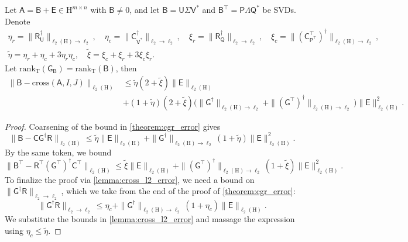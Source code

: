 \documentclass[onefignum,onetabnum]{siamart250211}
\renewenvironment{equation*}{\[}{\]\ignorespacesafterend}
\newcommand{\Hilb}{\mathrm{H}}
\newcommand{\Batrix}[1]{\bm{\Matrix{#1}}}
\newcommand{\Matrix}[1]{\mathsf{#1}}
\newcommand{\trans}{\intercal}
\newcommand{\pinv}{\dagger}
\newcommand{\Rank}[3][]{\mathrm{rank_{#2}} #1( #3 #1)}
\newcommand{\Index}[1]{{#1}}
\newcommand{\cross}[3][]{\mathrm{cross}#1(#2, #3 #1)}
\newcommand{\Norm}[3][]{#1\| #2 #1\|_{\mathrm{#3}}}
\begin{document}
\begin{theorem}
\label{theorem:cross_l2_error}
Let $\Batrix{A} = \Batrix{B} + \Batrix{E} \in \Hilb^{m \times n}$ with $\Batrix{B} \neq 0$, and let $\Batrix{B} = \Batrix{U} \Matrix{\Sigma} \Matrix{V}^\ast$ and $\Batrix{B}^\trans = \Batrix{P} \Matrix{\Lambda} \Matrix{Q}^\ast$ be SVDs.
Denote
\begin{gather*}
    \eta_r = \Norm{\Batrix{R}_{\Batrix{U}}^\pinv}{\ell_2(\Hilb) \to \ell_2}, \quad \eta_c = \Norm{\Matrix{C}_{\Matrix{V}^\ast}^\pinv}{\ell_2 \to \ell_2}, \quad \xi_r = \Norm{\Matrix{R}_{\Matrix{Q}}^\pinv}{\ell_2 \to \ell_2}, \quad \xi_c = \Norm{(\Batrix{C}_{\Batrix{P}^\trans}^\trans)^\pinv}{\ell_2(\Hilb) \to \ell_2}, \\
    \tilde{\eta} = \eta_r + \eta_c + 3 \eta_r \eta_c, \quad \tilde{\xi} = \xi_c + \xi_r + 3 \xi_c \xi_r.
\end{gather*}
Let $\Rank{T}{\Batrix{G}_{\Batrix{B}}} = \Rank{T}{\Batrix{B}}$, then
\begin{align*}
    \Norm{\Batrix{B} - \cross{\Batrix{A}}{\Index{I}, \Index{J}}}{\ell_2(\Hilb)} &\leq \tilde{\eta} (2 + \tilde{\xi}) \Norm{\Batrix{E}}{\ell_2(\Hilb)} \\
    &+ (1 + \tilde{\eta})(2 + \tilde{\xi}) \Big( \Norm{\Batrix{G}^\pinv}{\ell_2(\Hilb) \to \ell_2}  + \Norm{(\Batrix{G}^\trans)^\pinv}{\ell_2(\Hilb) \to \ell_2} \Big) \Norm{\Batrix{E}}{\ell_2(\Hilb)}^2.
\end{align*}
\end{theorem}
\begin{proof}
Coarsening of the bound in \cref{theorem:cgr_error} gives
\begin{equation*}
    \Norm{\Batrix{B} - \Batrix{C} \Batrix{G}^\pinv \Batrix{R}}{\ell_2(\Hilb)} \leq \tilde{\eta} \Norm{\Batrix{E}}{\ell_2(\Hilb)} + \Norm{\Batrix{G}^\pinv}{\ell_2(\Hilb) \to \ell_2} (1 + \tilde{\eta}) \Norm{\Batrix{E}}{\ell_2(\Hilb)}^2.
\end{equation*}
By the same token, we bound
\begin{equation*}
    \Norm{\Batrix{B}^\trans - \Batrix{R}^\trans (\Batrix{G}^\trans)^\pinv \Batrix{C}^\trans}{\ell_2(\Hilb)} \leq \tilde{\xi} \Norm{\Batrix{E}}{\ell_2(\Hilb)} + \Norm{(\Batrix{G}^\trans)^\pinv}{\ell_2(\Hilb) \to \ell_2} (1 + \tilde{\xi}) \Norm{\Batrix{E}}{\ell_2(\Hilb)}^2.
\end{equation*}
To finalize the proof via \cref{lemma:cross_l2_error}, we need a bound on $\Norm{\Batrix{G}^\pinv \Batrix{R}}{\ell_2 \to \ell_2}$, which we take from the end of the proof of \cref{theorem:cgr_error}:
\begin{equation*}
    \Norm{\Batrix{G}^\pinv \Batrix{R}}{\ell_2 \to \ell_2} \leq \eta_c + \Norm{\Batrix{G}^\pinv}{\ell_2(\Hilb) \to \ell_2} (1 + \eta_c) \Norm{\Batrix{E}}{\ell_2(\Hilb)}.
\end{equation*}
We substitute the bounds in \cref{lemma:cross_l2_error} and massage the expression using $\eta_c \leq \tilde{\eta}$.
\end{proof}
\end{document}
